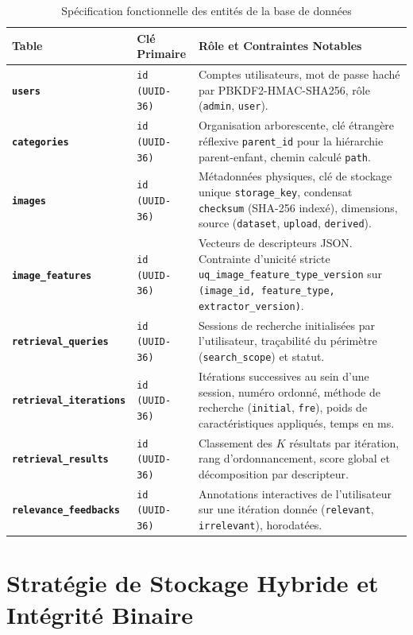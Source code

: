 \begin{table}[H]
\centering
{}
\begin{tabularx}{\textwidth}{>{\bfseries}p{3.2cm}p{3.0cm}X}
\toprule
\rowcolor{TableHeader}
\color{white}Table & \color{white}Clé Primaire & \color{white}Rôle et Contraintes Notables \\
\midrule
\texttt{users} & \texttt{id (UUID-36)} & Comptes utilisateurs, mot de passe haché par PBKDF2-HMAC-SHA256, rôle (\texttt{admin}, \texttt{user}). \\
\texttt{categories} & \texttt{id (UUID-36)} & Organisation arborescente, clé étrangère réflexive \texttt{parent\_id} pour la hiérarchie parent-enfant, chemin calculé \texttt{path}. \\
\texttt{images} & \texttt{id (UUID-36)} & Métadonnées physiques, clé de stockage unique \texttt{storage\_key}, condensat \texttt{checksum} (SHA-256 indexé), dimensions, source (\texttt{dataset}, \texttt{upload}, \texttt{derived}). \\
\texttt{image\_features} & \texttt{id (UUID-36)} & Vecteurs de descripteurs JSON. Contrainte d'unicité stricte \texttt{uq\_image\_feature\_type\_version} sur \texttt{(image\_id, feature\_type, extractor\_version)}. \\
\texttt{retrieval\_queries} & \texttt{id (UUID-36)} & Sessions de recherche initialisées par l'utilisateur, traçabilité du périmètre (\texttt{search\_scope}) et statut. \\
\texttt{retrieval\_iterations} & \texttt{id (UUID-36)} & Itérations successives au sein d'une session, numéro ordonné, méthode de recherche (\texttt{initial}, \texttt{fre}), poids de caractéristiques appliqués, temps en ms. \\
\texttt{retrieval\_results} & \texttt{id (UUID-36)} & Classement des $K$ résultats par itération, rang d'ordonnancement, score global et décomposition par descripteur. \\
\texttt{relevance\_feedbacks} & \texttt{id (UUID-36)} & Annotations interactives de l'utilisateur sur une itération donnée (\texttt{relevant}, \texttt{irrelevant}), horodatées. \\
\bottomrule
\end{tabularx}
\caption{Spécification fonctionnelle des entités de la base de données}
\label{tab:entites_db}
\end{table}

\section{Stratégie de Stockage Hybride et Intégrité Binaire}

